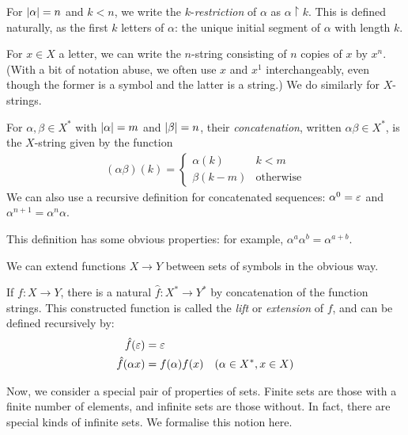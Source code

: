 \documentclass{article}
\begin{document}
For $\left\lvert \alpha \right\rvert = n$ and $k < n$, we write the $k$-\textit{restriction} of $\alpha$ as $\alpha \restriction k$. This is defined naturally, as the first $k$ letters of $\alpha$: the unique initial segment of $\alpha$ with length $k$.

\begin{note}
	For $x \in X$ a letter, we can write the $n$-string consisting of $n$ copies of $x$ by $x^n$. (With a bit of notation abuse, we often use $x$ and $x^1$ interchangeably, even though the former is a symbol and the latter is a string.) We do similarly for $X$-strings.
\end{note}

\begin{definition}[Concatenation]
	For $\alpha, \beta \in X^*$ with $\left\lvert \alpha \right\rvert = m$ and $\left\lvert \beta \right\rvert = n$, their \textit{concatenation}, written $\alpha\beta \in X^*$, is the $X$-string given by the function
	\begin{align*}
		(\alpha\beta)(k) = \begin{cases} \alpha(k) & k < m \\ \beta(k-m) & \text{otherwise} \end{cases}
	\end{align*}
	We can also use a recursive definition for concatenated sequences: $\alpha^0 = \varepsilon$ and $\alpha^{n+1} = \alpha^n \alpha$.
\end{definition}

\begin{corollary}
	This definition has some obvious properties: for example, $\alpha^a \alpha^b = \alpha ^{a+b}$.
\end{corollary}

We can extend functions $X \to Y$ between sets of symbols in the obvious way.

\begin{definition}[Lift]
	If $f: X \to Y$, there is a natural $\hat{f}: X^* \to Y^*$ by concatenation of the function strings. This constructed function is called the \textit{lift} or \textit{extension} of $f$, and can be defined recursively by:
	\begin{align*}
		\hat{f}(\varepsilon)     & = \varepsilon                                          \\
		\hat{f}(\alpha x) & = f(\alpha)f(x) \quad (\alpha \in X^*, x \in X) 
	\end{align*}
\end{definition}

Now, we consider a special pair of properties of sets. Finite sets are those with a finite number of elements, and infinite sets are those without. In fact, there are special kinds of infinite sets. We formalise this notion here.
\end{document}
